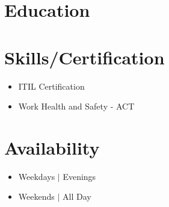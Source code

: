 \documentclass{resume_class}
\begin{document}
	\section{Education}
	\section{Skills/Certification}
	\begin{itemize}[leftmargin = 10pt , labelsep = 3pt , parsep = 0pt , itemsep = 2pt , label =  {\small $\bullet$} ] 
		\item \mdseries \Large  {ITIL Certification}
                \item \mdseries \Large  {Work Health and Safety - ACT}
	\end{itemize}
	
	\section{Availability }
	\begin{itemize}[leftmargin = 10pt , labelsep = 3pt , parsep = 0pt , itemsep = 2pt , label =  {\small $\bullet$} ] 
		\item \mdseries \Large Weekdays $|$ Evenings
		\item \mdseries \Large Weekends $|$ All Day
	\end{itemize}
	
\end{document}
